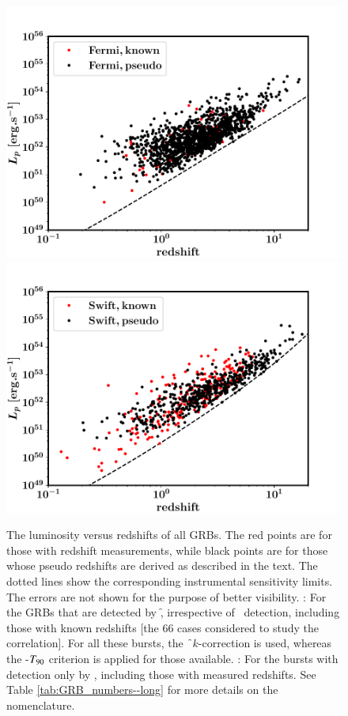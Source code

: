 \begin{figure}
\begin{center}
\includegraphics[scale=0.42]{L_vs_z--Fermi_long_all}
\includegraphics[scale=0.42]{L_vs_z--Swift_long_all}
\caption[Luminosity versus redshift of all long GRBs]{The luminosity versus redshifts of all GRBs. The red points are for those with redshift measurements, while black points are for those whose pseudo redshifts are derived as described in the text. The dotted lines show the corresponding instrumental sensitivity limits. The errors are not shown for the purpose of better visibility. \eL: For the GRBs that are detected by \f, irrespective of \s\ detection, including those with known redshifts [the 66 cases considered to study the correlation]. For all these bursts, the \f\ $k$-correction is used, whereas the \s-$T_{\rm{90}}$ criterion is applied for those available. \eR: For the bursts with detection only by \s, including those with measured redshifts. See Table \ref{tab:GRB_numbers--long} for more details on the nomenclature.}
\label{fig:pseudo_redshifts_and_luminosities--long}
\end{center}
\end{figure}


